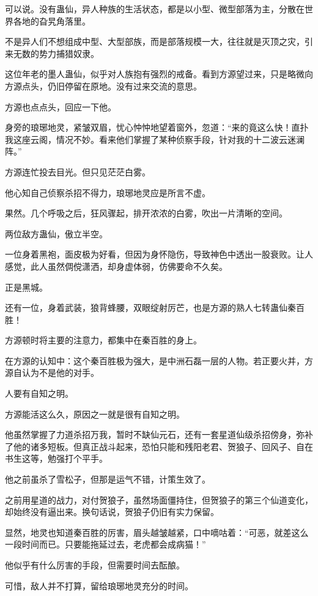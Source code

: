 \begin{this_body}
可以说。没有蛊仙，异人种族的生活状态，都是以小型、微型部落为主，分散在世界各地的旮旯角落里。

不是异人们不想组成中型、大型部族，而是部落规模一大，往往就是灭顶之灾，引来无数的势力捕猎奴隶。

这位年老的墨人蛊仙，似乎对人族抱有强烈的戒备。看到方源望过来，只是略微向方源点头，仍旧停留在原地。没有过来交流的意思。

方源也点点头，回应一下他。

身旁的琅琊地灵，紧皱双眉，忧心忡忡地望着窗外，忽道：“来的竟这么快！直扑我这座云阁，情况不妙。看来他们掌握了某种侦察手段，针对我的十二波云迷澜阵。”

方源连忙投去目光。但只见茫茫白雾。

他心知自己侦察杀招不得力，琅琊地灵应是所言不虚。

果然。几个呼吸之后，狂风骤起，排开浓浓的白雾，吹出一片清晰的空间。

两位敌方蛊仙，傲立半空。

一位身着黑袍，面皮极为好看，但因为身怀隐伤，导致神色中透出一股衰败。让人感觉，此人虽然倜傥潇洒，却身虚体弱，仿佛要命不久矣。

正是黑城。

还有一位，身着武装，狼背蜂腰，双眼绽射厉芒，也是方源的熟人七转蛊仙秦百胜！

方源顿时将主要的注意力，都集中在秦百胜的身上。

在方源的认知中：这个秦百胜极为强大，是中洲石磊一层的人物。若正要火并，方源自认为不是他的对手。

人要有自知之明。

方源能活这么久，原因之一就是很有自知之明。

他虽然掌握了力道杀招万我，暂时不缺仙元石，还有一套星道仙级杀招傍身，弥补了他的诸多短板。但真正战斗起来，恐怕只能和残阳老君、贺狼子、回风子、自在书生这等，勉强打个平手。

他之前虽杀了雪松子，但那是运气不错，计策生效了。

之前用星道的战力，对付贺狼子，虽然场面僵持住，但贺狼子的第三个仙道变化，却始终没有逼出来。换句话说，贺狼子仍旧有实力保留。

显然，地灵也知道秦百胜的厉害，眉头越皱越紧，口中嘀咕着：“可恶，就差这么一段时间而已。只要能拖延过去，老虎都会成病猫！”

他似乎有什么厉害的手段，但需要时间去酝酿。

可惜，敌人并不打算，留给琅琊地灵充分的时间。


\end{this_body}
